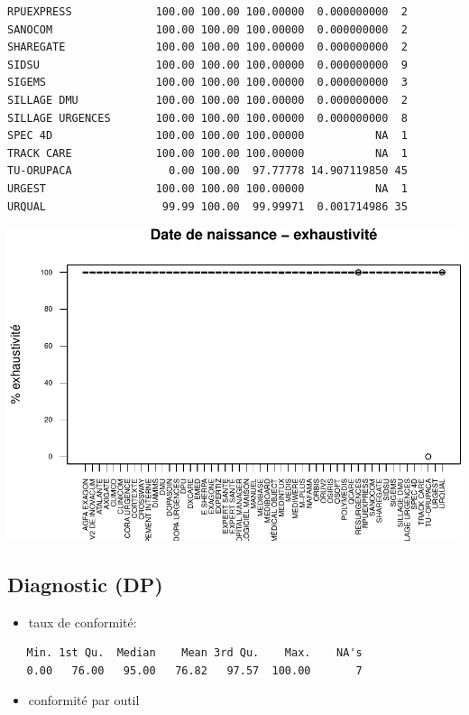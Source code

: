 \documentclass[]{article}
\begin{document}
\begin{verbatim}
RPUEXPRESS             100.00 100.00 100.00000  0.000000000  2
SANOCOM                100.00 100.00 100.00000  0.000000000  2
SHAREGATE              100.00 100.00 100.00000  0.000000000  2
SIDSU                  100.00 100.00 100.00000  0.000000000  9
SIGEMS                 100.00 100.00 100.00000  0.000000000  3
SILLAGE DMU            100.00 100.00 100.00000  0.000000000  2
SILLAGE URGENCES       100.00 100.00 100.00000  0.000000000  8
SPEC 4D                100.00 100.00 100.00000           NA  1
TRACK CARE             100.00 100.00 100.00000           NA  1
TU-ORUPACA               0.00 100.00  97.77778 14.907119850 45
URGEST                 100.00 100.00 100.00000           NA  1
URQUAL                  99.99 100.00  99.99971  0.001714986 35
\end{verbatim}

\includegraphics{septembre2015_files/figure-latex/unnamed-chunk-16-1.pdf}

\subsection{Diagnostic (DP)}\label{diagnostic-dp}

\begin{itemize}
\itemsep1pt\parskip0pt
\item
  taux de conformité:
\end{itemize}

\begin{verbatim}
   Min. 1st Qu.  Median    Mean 3rd Qu.    Max.    NA's 
   0.00   76.00   95.00   76.82   97.57  100.00       7 
\end{verbatim}

\begin{itemize}
\itemsep1pt\parskip0pt
\item
  conformité par outil
\end{itemize}
\end{document}
